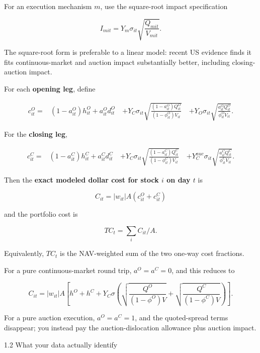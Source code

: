 For an execution mechanism \(m\), use the square-root impact specification

\[
I_{mit}
=
Y_m\sigma_{it}
\sqrt{\frac{Q_{mit}}{V_{mit}}}.
\]

The square-root form is preferable to a linear model: recent US evidence finds it fits continuous-market and auction impact substantially better, including closing-auction impact.

For each \textbf{opening leg}, define

\[
\begin{aligned}
c^O_{it}
={}&
(1-a^O_{it})h^O_{it}
+a^O_{it}d^O_{it}\
&+
Y_C\sigma_{it}
\sqrt{
\frac{(1-a^O_{it})Q^O_{it}}
{(1-\phi^O_{it})V_{it}}
}\
&+
Y_O\sigma_{it}
\sqrt{
\frac{a^O_{it}Q^O_{it}}
{\phi^O_{it}V_{it}}
}.
\end{aligned}
\]

For the \textbf{closing leg},

\[
\begin{aligned}
c^C_{it}
={}&
(1-a^C_{it})h^C_{it}
+a^C_{it}d^C_{it}\
&+
Y_C\sigma_{it}
\sqrt{
\frac{(1-a^C_{it})Q^C_{it}}
{(1-\phi^C_{it})V_{it}}
}\
&+
Y_{C}^{auc}\sigma_{it}
\sqrt{
\frac{a^C_{it}Q^C_{it}}
{\phi^C_{it}V_{it}}
}.
\end{aligned}
\]

Then the \textbf{exact modeled dollar cost for stock \(i\) on day \(t\)} is

\[
\boxed{
C_{it}
=
|w_{it}|A
\left(c^O_{it}+c^C_{it}\right)
}
\]

and the portfolio cost is

\[
\boxed{
TC_t=\sum_i C_{it}/A.
}
\]

Equivalently, \(TC_t\) is the NAV-weighted sum of the two one-way cost fractions.

For a pure continuous-market round trip, \(a^O=a^C=0\), and this reduces to

\[
C_{it}
=
|w_{it}|A
\left[
h^O+h^C
+
Y_C\sigma
\left(
\sqrt{\frac{Q^O}{(1-\phi^O)V}}
+
\sqrt{\frac{Q^C}{(1-\phi^C)V}}
\right)
\right].
\]

For a pure auction execution, \(a^O=a^C=1\), and the quoted-spread terms disappear; you instead pay the auction-dislocation allowance plus auction impact.

1.2 What your data actually identify

